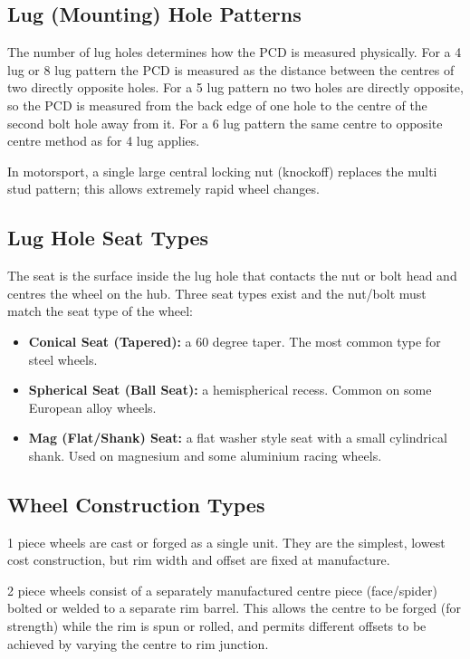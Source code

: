 \documentclass[10pt,a4paper]{article}
\begin{document}
\subsection{Lug (Mounting) Hole Patterns}

The number of lug holes determines how the PCD is measured physically. For a 4 lug or 8 lug pattern the PCD is measured as the distance between the centres of two directly opposite holes. For a 5 lug pattern no two holes are directly opposite, so the PCD is measured from the back edge of one hole to the centre of the second bolt hole away from it. For a 6 lug pattern the same centre to opposite centre method as for 4 lug applies.

In motorsport, a single large central locking nut (knockoff) replaces the multi stud pattern; this allows extremely rapid wheel changes.

\subsection{Lug Hole Seat Types}

The seat is the surface inside the lug hole that contacts the nut or bolt head and centres the wheel on the hub. Three seat types exist and the nut/bolt must match the seat type of the wheel:
\begin{itemize}
\item \textbf{Conical Seat (Tapered):} a 60 degree taper. The most common type for steel wheels.
\item \textbf{Spherical Seat (Ball Seat):} a hemispherical recess. Common on some European alloy wheels.
\item \textbf{Mag (Flat/Shank) Seat:} a flat washer style seat with a small cylindrical shank. Used on magnesium and some aluminium racing wheels.
\end{itemize}

\subsection{Wheel Construction Types}

1 piece wheels are cast or forged as a single unit. They are the simplest, lowest cost construction, but rim width and offset are fixed at manufacture.

2 piece wheels consist of a separately manufactured centre piece (face/spider) bolted or welded to a separate rim barrel. This allows the centre to be forged (for strength) while the rim is spun or rolled, and permits different offsets to be achieved by varying the centre to rim junction.
\end{document}
